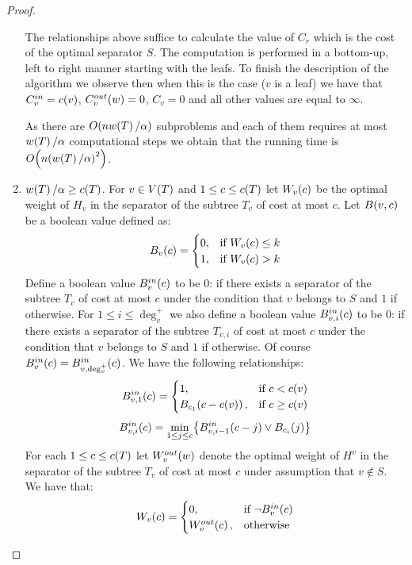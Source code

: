 \begin{theorem}
\begin{proof}
\begin{enumerate}
            The relationships above suffice to calculate the value of $C_{r}$ which is the cost of the optimal separator $S$. The computation is performed in a bottom-up, left to right manner starting with the leafs. To finish the description of the algorithm we observe then when this is the case ($v$ is a leaf) we have that $C_v^{in}=c\mathopen{}\left( v \right)$, $C_v^{out}\mathopen{}\left( w \right)=0$, $C_v = 0$ and all other values are equal to $\infty$.

            As there are $O\mathopen{}\left( nw\mathopen{}\left( T \right)/\alpha \right)$ subproblems and each of them requires at most $w\mathopen{}\left( T \right)/\alpha$ computational steps we obtain that the running time is  $O\mathopen{}\left( n\mathopen{}\left( w\mathopen{}\left( T \right)/\alpha \right)^2 \right)$.
            \item $w\mathopen{}\left( T \right)/\alpha\geq c\mathopen{}\left( T \right)$. For $v\in V\mathopen{}\left( T \right)$ and $1\leq c\leq c\mathopen{}\left( T \right)$ let $W_{v}\mathopen{}\left( c \right)$ be the optimal weight of $H_v$ in the separator of the subtree $T_v$ of cost at most $c$. Let $B\mathopen{}\left( v, c \right)$ be a boolean value defined as:
            $$
            B_{v}\mathopen{}\left( c \right)=\begin{cases}
                0, & \text{if } W_{v}\mathopen{}\left( c \right) \leq k\\
                1, & \text{if } W_{v}\mathopen{}\left( c \right) > k\\
            \end{cases}
            $$
            Define a boolean value $B_{v}^{in}\mathopen{}\left( c \right)$ to be $0$: if there exists a separator of the subtree $T_v$ of cost at most $c$ under the condition that $v$ belongs to $S$ and $1$ if otherwise. For $1\leq i\leq \deg_{v}^+$ we also define a boolean value $B_{v, i}^{in}\mathopen{}\left( c \right)$ to be $0$: if there exists a separator of the subtree $T_{v,i}$ of cost at most $c$ under the condition that $v$ belongs to $S$ and $1$ if otherwise. Of course $B_{v}^{in}\mathopen{}\left( c \right)=B_{v, \deg_v^+}^{in}\mathopen{}\left( c \right)$. We have the following relationships:
            $$
            B_{v,1}^{in}\mathopen{}\left( c \right)=\begin{cases}
                1, & \text{if } c < c\mathopen{}\left( v \right)\\
                B_{c_1}\mathopen{}\left( c-c\mathopen{}\left( v \right) \right), & \text{if } c \geq c\mathopen{}\left( v \right)\\
            \end{cases}
            $$
            $$
            B_{v, i}^{in}\mathopen{}\left( c \right) = \min_{1\leq j\leq c}\mathopen{}\left\{ B_{v, i-1}^{in}\mathopen{}\left( c-j \right)\lor B_{c_i}\mathopen{}\left( j \right) \right\}
            $$
            For each $1\leq c\leq c\mathopen{}\left( T \right)$ let $W_v^{out}\mathopen{}\left( w \right)$ denote the optimal weight of $H^v$ in the separator of the subtree $T_v$ of cost at most $c$ under assumption that $v\notin S$. We have that:
            $$
            W_v\mathopen{}\left( c \right) = \begin{cases}
                0, & \text{if } \neg B_{v}^{in}\mathopen{}\left( c \right)\\
                W_v^{out}\mathopen{}\left( c \right), & \text{otherwise }
            \end{cases}
            $$
            

\end{enumerate}
\end{proof}
\end{theorem}
